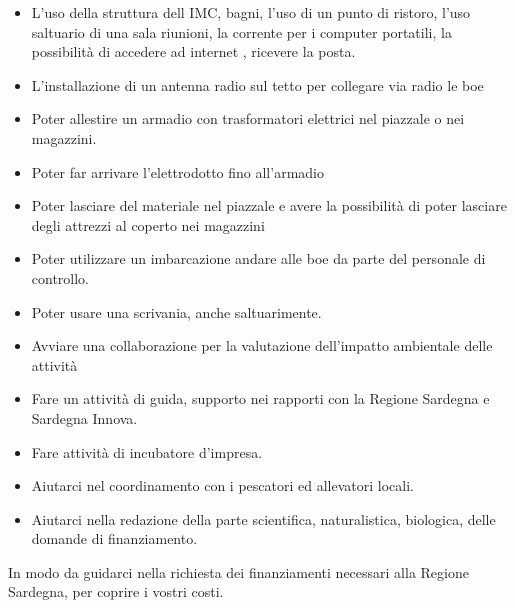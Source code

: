\documentclass[
  onecolumn]{report}
\begin{document}
\begin{itemize}
\item
  L'uso della struttura dell IMC, bagni, l'uso di un punto di ristoro,
  l'uso saltuario di una sala riunioni, la corrente per i computer
  portatili, la possibilità di accedere ad internet , ricevere la posta.
\item
  L'installazione di un antenna radio sul tetto per collegare via radio
  le boe
\item
  Poter allestire un armadio con trasformatori elettrici nel piazzale o
  nei magazzini.
\item
  Poter far arrivare l'elettrodotto fino all'armadio
\item
  Poter lasciare del materiale nel piazzale e avere la possibilità di
  poter lasciare degli attrezzi al coperto nei magazzini
\item
  Poter utilizzare un imbarcazione andare alle boe da parte del
  personale di controllo.
\item
  Poter usare una scrivania, anche saltuarimente.
\item
  Avviare una collaborazione per la valutazione dell'impatto ambientale
  delle attività
\item
  Fare un attività di guida, supporto nei rapporti con la Regione
  Sardegna e Sardegna Innova.
\item
  Fare attività di incubatore d'impresa.
\item
  Aiutarci nel coordinamento con i pescatori ed allevatori locali.
\item
  Aiutarci nella redazione della parte scientifica, naturalistica,
  biologica, delle domande di finanziamento.
\end{itemize}

In modo da guidarci nella richiesta dei finanziamenti necessari alla
Regione Sardegna, per coprire i vostri costi.
\end{document}
